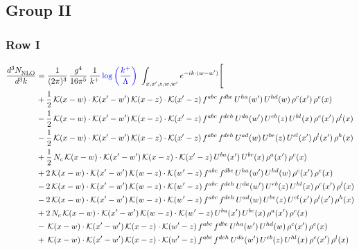 \documentclass[9pt]{article}
\numberwithin{equation}{section}
\begin{document}
\subsection{Group II}
\subsubsection{Row I}
\begin{align}
 \frac{d^{3}N_{\rm NLO}^{\rm}}{d^{3}k}  & = \frac{1}{(2\pi)^{3}}\,\frac{g^{4}}{16\pi^{5}}\,\frac{1}{k^{+}}\,{\color{blue}\log{\left(\frac{k^{+}}{\Lambda}\right)}}\,\,\int_{x,x',z,w,w'}e^{-ik\cdot(w-w')}\Bigg[\notag\\
&+\frac{1}{2}\,\mathcal{K}(x-w)\cdot\mathcal{K}(x'-w')\,\mathcal{K}(x-z)\cdot\mathcal{K}(x'-z)\,f^{abc}\,f^{dbe}\,U^{ha}(w')\,U^{hd}(w)\,\rho^{c}(x')\,\rho^{e}(x)\notag\\
&-\frac{1}{2}\,\mathcal{K}(x-w)\cdot\mathcal{K}(x'-w')\,\mathcal{K}(x-z)\cdot\mathcal{K}(x'-z)\,f^{abc}\,f^{deh}\,U^{da}(w')\,U^{eb}(z)\,U^{hl}(x)\,\rho^{c}(x')\,\rho^{l}(x)\notag\\
&-\frac{1}{2}\,\mathcal{K}(x-w)\cdot\mathcal{K}(x'-w')\,\mathcal{K}(x-z)\cdot\mathcal{K}(x'-z)\,f^{abc}\,f^{deh}\,U^{ad}(w)\,U^{be}(z)\,U^{cl}(x')\,\rho^{l}(x')\,\rho^{h}(x)\notag\\
&+\frac{1}{2}\,N_{c}\,\mathcal{K}(x-w)\cdot\mathcal{K}(x'-w')\,\mathcal{K}(x-z)\cdot\mathcal{K}(x'-z)\,U^{ba}(x')\,U^{bc}(x)\,\rho^{a}(x')\,\rho^{c}(x)\notag\\
&+2\,\mathcal{K}(x-w)\cdot\mathcal{K}(x'-w')\,\mathcal{K}(w-z)\cdot\mathcal{K}(w'-z)\,f^{abc}\,f^{dbe}\,U^{ha}(w')\,U^{hd}(w)\,\rho^{c}(x')\,\rho^{e}(x)\notag\\
&-2\,\mathcal{K}(x-w)\cdot\mathcal{K}(x'-w')\,\mathcal{K}(w-z)\cdot\mathcal{K}(w'-z)\,f^{abc}\,f^{deh}\,U^{da}(w')\,U^{eb}(z)\,U^{hl}(x)\,\rho^{c}(x')\,\rho^{l}(x)\notag\\
&-2\,\mathcal{K}(x-w)\cdot\mathcal{K}(x'-w')\,\mathcal{K}(w-z)\cdot\mathcal{K}(w'-z)\,f^{abc}\,f^{deh}\,U^{ad}(w)\,U^{be}(z)\,U^{cl}(x')\,\rho^{l}(x')\,\rho^{h}(x)\notag\\
&+2\,N_{c}\,\mathcal{K}(x-w)\cdot\mathcal{K}(x'-w')\,\mathcal{K}(w-z)\cdot\mathcal{K}(w'-z)\,U^{ba}(x')\,U^{bc}(x)\,\rho^{a}(x')\,\rho^{c}(x)\notag\\
&-\,\mathcal{K}(x-w)\cdot\mathcal{K}(x'-w')\,\mathcal{K}(x-z)\cdot\mathcal{K}(w'-z)\,f^{abc}\,f^{dbe}\,U^{ha}(w')\,U^{hd}(w)\,\rho^{c}(x')\,\rho^{e}(x)\notag\\
&+\,\mathcal{K}(x-w)\cdot\mathcal{K}(x'-w')\,\mathcal{K}(x-z)\cdot\mathcal{K}(w'-z)\,f^{abc}\,f^{deh}\,U^{da}(w')\,U^{eb}(z)\,U^{hl}(x)\,\rho^{c}(x')\,\rho^{l}(x)\notag\\

\end{align}
\end{document}
